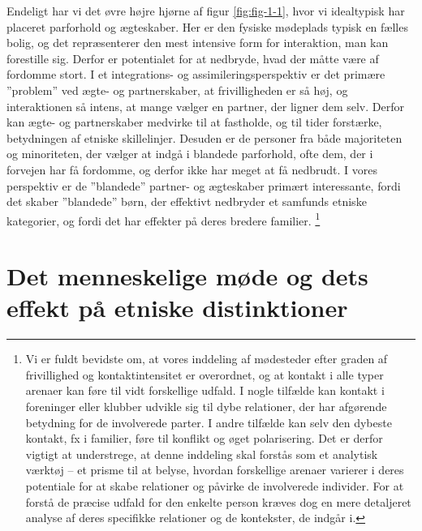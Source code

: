 \documentclass[
]{book}
\begin{document}
Endeligt har vi det øvre højre hjørne af figur \ref{fig:fig-1-1}, hvor vi idealtypisk har placeret parforhold og ægteskaber. Her er den fysiske mødeplads typisk en fælles bolig, og det repræsenterer den mest intensive form for interaktion, man kan forestille sig. Derfor er potentialet for at nedbryde, hvad der måtte være af fordomme stort. I et integrations- og assimileringsperspektiv er det primære ''problem'' ved ægte- og partnerskaber, at frivilligheden er så høj, og interaktionen så intens, at mange vælger en partner, der ligner dem selv. Derfor kan ægte- og partnerskaber medvirke til at fastholde, og til tider forstærke, betydningen af etniske skillelinjer. Desuden er de personer fra både majoriteten og minoriteten, der vælger at indgå i blandede parforhold, ofte dem, der i forvejen har få fordomme, og derfor ikke har meget at få nedbrudt. I vores perspektiv er de ''blandede'' partner- og ægteskaber primært interessante, fordi det skaber ''blandede'' børn, der effektivt nedbryder et samfunds etniske kategorier, og fordi det har effekter på deres bredere familier. \footnote{Vi er fuldt bevidste om, at vores inddeling af mødesteder efter graden af frivillighed og kontaktintensitet er overordnet, og at kontakt i alle typer arenaer kan føre til vidt forskellige udfald. I nogle tilfælde kan kontakt i foreninger eller klubber udvikle sig til dybe relationer, der har afgørende betydning for de involverede parter. I andre tilfælde kan selv den dybeste kontakt, fx i familier, føre til konflikt og øget polarisering. Det er derfor vigtigt at understrege, at denne inddeling skal forstås som et analytisk værktøj -- et prisme til at belyse, hvordan forskellige arenaer varierer i deres potentiale for at skabe relationer og påvirke de involverede individer. For at forstå de præcise udfald for den enkelte person kræves dog en mere detaljeret analyse af deres specifikke relationer og de kontekster, de indgår i.}

\section{Det menneskelige møde og dets effekt på etniske distinktioner}\label{det-menneskelige-muxf8de-og-dets-effekt-puxe5-etniske-distinktioner}
\end{document}
